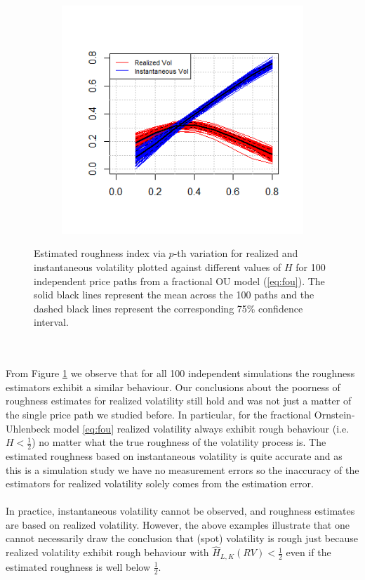 \documentclass{article}
\begin{document}
\begin{figure}[htbp]
    \centering
    
    \begin{subfigure}{0.78\textwidth}
        \includegraphics[width=\linewidth]{ex7_plot100.png}
    \end{subfigure}
    
    \caption{Estimated roughness index via $p$-th variation for realized and instantaneous volatility plotted against different values of $H$ for 100 independent price paths from a fractional OU model (\ref{eq:fou}). The solid black lines represent the mean across the 100 paths and the dashed black lines represent the corresponding 75\% confidence interval.}
    \label{fig:ex7plot100}
\end{figure}\\\\
From Figure \ref{fig:ex7plot100} we observe that for all 100 independent simulations the roughness estimators exhibit a similar behaviour. Our conclusions about the poorness of roughness estimates for realized volatility still hold and was not just a matter of the single price path we studied before. In particular, for the fractional Ornstein-Uhlenbeck model \ref{eq:fou} realized volatility always exhibit rough behaviour (i.e. $H<\frac{1}{2}$) no matter what the true roughness of the volatility process is. The estimated roughness based on instantaneous volatility is quite accurate and as this is a simulation study we have no measurement errors so the inaccuracy of the estimators for realized volatility solely comes from the estimation error. \\\\
In practice, instantaneous volatility cannot be observed, and roughness estimates are based on realized volatility. However, the above examples illustrate that one cannot necessarily draw the conclusion that (spot) volatility is rough just because realized volatility exhibit rough behaviour with $\hat{H}_{L,K}(RV)<\frac{1}{2}$ even if the estimated roughness is well below $\frac{1}{2}$.
\end{document}

